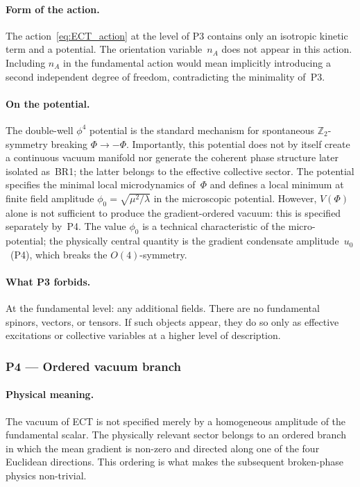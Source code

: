 \documentclass[11pt,a4paper]{article}
\numberwithin{equation}{section}
\begin{document}
\paragraph{Form of the action.}
The action~\eqref{eq:ECT_action} at the level of P3 contains only
an isotropic kinetic term and a potential.
The orientation variable~$n_A$ does not appear in this action.
Including $n_A$ in the fundamental action would mean implicitly
introducing a second independent degree of freedom,
contradicting the minimality of~P3.

\paragraph{On the potential.}
The double-well $\phi^4$ potential is the standard mechanism for
spontaneous $\mathbb{Z}_2$-symmetry breaking $\Phi\to-\Phi$.
Importantly, this potential does not by itself create a continuous
vacuum manifold nor generate the coherent phase structure later isolated as~BR1;
the latter belongs to the effective collective sector.
The potential specifies the minimal local microdynamics of~$\Phi$
and defines a local minimum at finite field amplitude
$\phi_0=\sqrt{\mu^2/\lambda}$ in the microscopic potential.
However, $V(\Phi)$ alone is not sufficient to produce the
gradient-ordered vacuum: this is specified separately by~P4.
The value $\phi_0$ is a technical characteristic of the micro-potential;
the physically central quantity is the gradient condensate
amplitude~$u_0$~(P4), which breaks the $O(4)$-symmetry.

\paragraph{What P3 forbids.}
At the fundamental level: any additional fields.
There are no fundamental spinors, vectors, or tensors.
If such objects appear, they do so only as effective excitations
or collective variables at a higher level of description.

\subsubsection*{P4 --- Ordered vacuum branch}

\paragraph{Physical meaning.}
The vacuum of ECT is not specified merely by a homogeneous amplitude
of the fundamental scalar. The physically relevant sector belongs to
an ordered branch in which the mean gradient is non-zero and directed
along one of the four Euclidean directions. This ordering is what
makes the subsequent broken-phase physics non-trivial.
\end{document}
